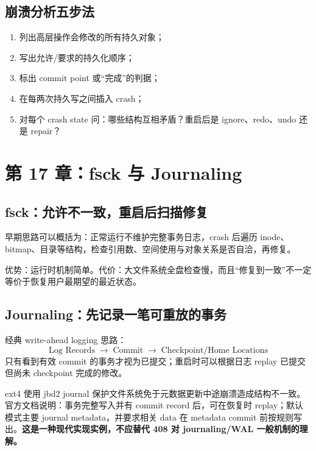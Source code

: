 \documentclass[11pt,a4paper]{ctexart}
\newcommand{\kw}[1]{\textbf{#1}}
\newcommand{\code}[1]{\texttt{\detokenize{#1}}}
\newcommand{\arr}{\;\longrightarrow\;}
\begin{document}
\subsection{崩溃分析五步法}
\begin{method}
\begin{enumerate}
  \item 列出高层操作会修改的所有持久对象；
  \item 写出允许/要求的持久化顺序；
  \item 标出 commit point 或“完成”的判据；
  \item 在每两次持久写之间插入 crash；
  \item 对每个 crash state 问：哪些结构互相矛盾？重启后是 ignore、redo、undo 还是 repair？
\end{enumerate}
\end{method}

\section{第 17 章：fsck 与 Journaling}

\subsection{fsck：允许不一致，重启后扫描修复}
早期思路可以概括为：正常运行不维护完整事务日志，crash 后遍历 inode、bitmap、目录等结构，检查引用数、空间使用与对象关系是否自洽，再修复。

优势：运行时机制简单。代价：大文件系统全盘检查慢，而且“修复到一致”不一定等价于恢复用户最期望的最近状态。

\subsection{Journaling：先记录一笔可重放的事务}
经典 write-ahead logging 思路：
\[
\boxed{\text{Log Records}\arr\text{Commit}\arr\text{Checkpoint/Home Locations}}
\]
只有看到有效 commit 的事务才视为已提交；重启时可以根据日志 replay 已提交但尚未 checkpoint 完成的修改。

\begin{eng}
ext4 使用 jbd2 journal 保护文件系统免于元数据更新中途崩溃造成结构不一致。官方文档说明：事务完整写入并有 commit record 后，可在恢复时 replay；默认 \code{data=ordered} 模式主要 journal metadata，并要求相关 data 在 metadata commit 前按规则写出。\kw{这是一种现代实现实例，不应替代 408 对 journaling/WAL 一般机制的理解。}
\end{eng}
\end{document}
